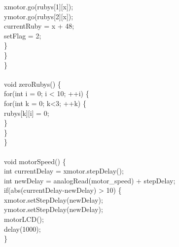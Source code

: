 \tabto*{1.5cm} xmotor.go(rubys[1][x]);\\
\tabto*{1.5cm} ymotor.go(rubys[2][x]);\\
\tabto*{1.5cm} currentRuby = x + 48;\\
\tabto*{1.5cm} setFlag = 2;\\
\tabto*{1cm} \}\\
\tabto*{.5cm}\}\\
\}\\
\\
void zeroRubys() \{\\
\tabto*{.5cm} for(int i = 0; i < 10; ++i) \{\\
\tabto*{1cm} for(int k = 0; k<3; ++k) \{\\
\tabto*{1.5cm} rubys[k][i] = 0;\\
\tabto*{1cm}\}\\
\tabto*{.5cm} \}\\
\}\\
\\
void motorSpeed() \{\\
\tabto*{.5cm} int currentDelay = xmotor.stepDelay();\\
\tabto*{.5cm} int newDelay = analogRead(motor\_speed) + stepDelay;\\
\tabto*{.5cm} if(abs(currentDelay-newDelay) > 10) \{\\
\tabto*{1cm} xmotor.setStepDelay(newDelay);\\
\tabto*{1cm} ymotor.setStepDelay(newDelay);\\
\tabto*{1cm} motorLCD();\\
\tabto*{1cm} delay(1000);\\
\tabto*{.5cm}\}\\
